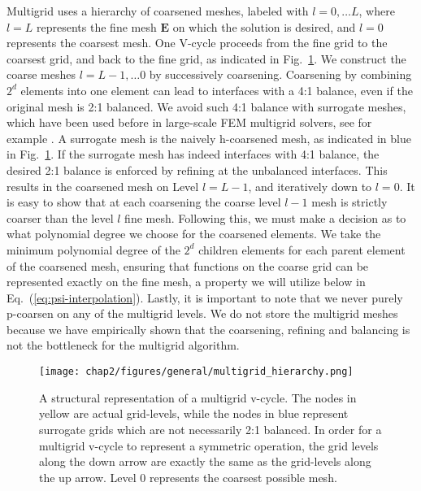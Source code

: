 Multigrid uses a hierarchy of coarsened meshes, labeled with
$l=0, \ldots L$, where $l=L$
represents the fine mesh $\mathbf{E}$ on which the solution is
desired, and $l=0$ represents the coarsest mesh.  One V-cycle proceeds
from the fine grid to the coarsest grid, and back to the fine grid, as
indicated in Fig.~\ref{fig:vcycle}.  We construct the coarse meshes
$l=L-1, \ldots 0$ by successively coarsening. Coarsening by
  combining $2^d$ elements into one element can lead to interfaces
  with a 4:1 balance, even if the original mesh is 2:1 balanced.  We
  avoid such 4:1 balance with
surrogate meshes, which have been used before in large-scale FEM
multigrid solvers, see for example
\cite{sampath2008dendro,sundar2012parallel}.  A surrogate mesh is the
naively h-coarsened mesh, as indicated in blue in
Fig.~\ref{fig:vcycle}.  If the surrogate mesh has indeed interfaces
with 4:1 balance, the desired 2:1 balance is enforced by refining at
the unbalanced interfaces.  This results in the coarsened mesh on
Level $l=L-1$, and iteratively down to $l=0$.  It is easy to show that
at each coarsening the coarse level $l-1$ mesh is strictly
coarser than the level $l$ fine mesh.  Following this, we must make a decision as to what
polynomial degree we choose for the coarsened elements. We take the minimum polynomial degree of the $2^{d}$
children elements for each parent element of the coarsened mesh, ensuring that functions on the coarse grid can be represented exactly on the fine mesh, a property we will utilize below in Eq.~(\ref{eq:psi-interpolation}). Lastly, it is important to note that we never purely p-coarsen on any of the multigrid levels.
We do not store the multigrid meshes
because we have empirically shown that the coarsening, refining and
balancing is not the bottleneck for the multigrid algorithm.

%
\begin{figure}
\texttt{[image: chap2/figures/general/multigrid\_hierarchy.png]}
\caption{
  \label{fig:vcycle}
  A structural representation of a multigrid v-cycle. The nodes in yellow are actual grid-levels, while the nodes in blue represent surrogate grids which are not necessarily 2:1 balanced. In order for a multigrid v-cycle to represent a symmetric operation, the grid levels along the down arrow are exactly the same as the grid-levels along the up arrow. Level 0 represents the coarsest possible mesh.} 
\end{figure}
%

